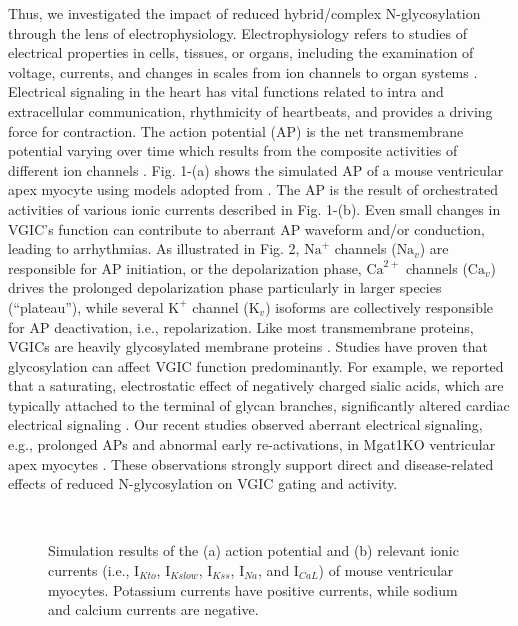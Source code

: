 \documentclass[journal]{IEEEtran}
\begin{document}
Thus, we investigated the impact of reduced hybrid/complex N-glycosylation through the lens of electrophysiology. Electrophysiology refers to studies of electrical properties in cells, tissues, or organs, including the examination of voltage, currents, and changes in scales from ion channels to organ systems \cite{scanziani2009electrophysiology}. Electrical signaling in the heart has vital functions related to intra and extracellular communication, rhythmicity of heartbeats, and provides a driving force for contraction. The action potential (AP) is the net transmembrane potential varying over time which results from the composite activities of different ion channels \cite{grant2009cardiac}. Fig. 1-(a) shows the simulated AP of a mouse ventricular apex myocyte using models adopted from \cite{bondarenko2004computer}. The AP is the result of orchestrated activities of various ionic currents described in Fig. 1-(b). Even small changes in VGIC's function can contribute to aberrant AP waveform and/or conduction, leading to arrhythmias. As illustrated in Fig. 2, $\text{Na}^{+}$ channels ($\text{Na}_{v}$) are responsible for AP initiation, or the depolarization phase, $\text{Ca}^{2+}$ channels ($\text{Ca}_{v}$) drives the prolonged depolarization phase particularly in larger species (“plateau”), while several $\text{K}^{+}$ channel ($\text{K}_{v}$) isoforms are collectively responsible for AP deactivation, i.e., repolarization. Like most transmembrane proteins, VGICs are heavily glycosylated membrane proteins \cite{ednie2011modulation}. Studies have proven that glycosylation can affect VGIC function predominantly. For example, we reported that a saturating, electrostatic effect of negatively charged sialic acids, which are typically attached to the terminal of glycan branches, significantly altered cardiac electrical signaling \cite{ednie2013expression, ednie2015reduced}. Our recent studies observed aberrant electrical signaling, e.g., prolonged APs and abnormal early re-activations, in Mgat1KO ventricular apex myocytes \cite{ednie2019reduced, ednie2019reduced2}. These observations strongly support direct and disease-related effects of reduced N-glycosylation on VGIC gating and activity.
\begin{figure}
    \label{fig1}
    \centering
    \\
    \caption{Simulation results of the (a) action potential and (b) relevant ionic currents (i.e., $\text{I}_{Kto}$, $\text{I}_{Kslow}$, $\text{I}_{Kss}$, $\text{I}_{Na}$, and $\text{I}_{CaL}$) of mouse ventricular myocytes. Potassium currents have positive currents, while sodium and calcium currents are negative.}
\end{figure}
\end{document}
